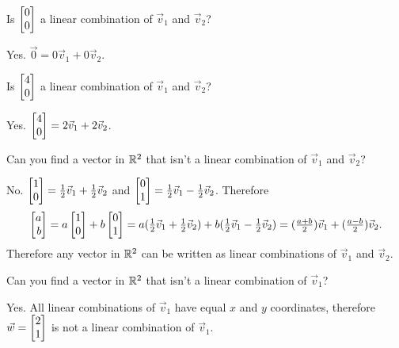 \begin{slide}
\begin{parts}
		\item Is $\mat{0\\0}$ a linear combination of $\vec v_1$ and $\vec v_2$?
			\begin{solution}[inline]
				Yes. $\vec 0=0\vec v_1+0\vec v_2$.
			\end{solution}
		\item Is $\mat{4\\0}$ a linear combination of $\vec v_1$ and $\vec v_2$?
			\begin{solution}[inline]
				Yes. $\mat{4\\0}=2\vec v_1+2\vec v_2$.
			\end{solution}
		\item Can you find a vector in $\mathbb{R}^2$ that isn't a linear combination of
		$\vec v_1$ and $\vec v_2$?
			\begin{solution}
				No. $\mat{1\\0}=\tfrac{1}{2}\vec v_1+\tfrac{1}{2}\vec v_2$ and
				$\mat{0\\1}=\tfrac{1}{2}\vec v_1-\tfrac{1}{2}\vec v_2$.
				Therefore
				\[
					\mat{a\\b}
					= a\mat{1\\0}+b\mat{0\\1}
					= a(\tfrac{1}{2}\vec v_1+\tfrac{1}{2}\vec v_2)
						+b(\tfrac{1}{2}\vec v_1-\tfrac{1}{2}\vec v_2)
					=(\tfrac{a+b}{2})\vec v_1+(\tfrac{a-b}{2})\vec v_2.
				\]
				Therefore any vector in $\mathbb{R}^2$ can be written as linear combinations
				of $\vec v_1$ and $\vec v_2$.
			\end{solution}
		\item Can you find a vector in $\mathbb{R}^2$ that isn't a linear combination of
			$\vec v_1$?
			\begin{solution}
				Yes. All linear combinations of $\vec v_1$ have equal $x$ and
				$y$ coordinates, therefore $\vec w=\mat{2\\1}$ is not a linear
				combination of $\vec v_1$.
			\end{solution}
	\end{parts}
\end{slide}


